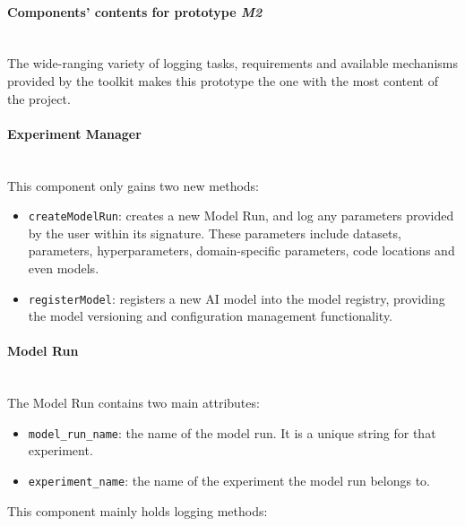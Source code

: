 \paragraph{Components' contents for prototype \emph{M2}} \mbox{} \\

The wide-ranging variety of logging tasks, requirements and available mechanisms provided by the toolkit makes this prototype the one with the most content of the
project.

\paragraph{Experiment Manager} \mbox{} \\

This component only gains two new methods:

\begin{itemize}
    \item \texttt{createModelRun}: creates a new Model Run, and log any parameters provided by the user within its signature. These parameters include
    datasets, parameters, hyperparameters, domain-specific parameters, code locations and even models.

    \item \texttt{registerModel}: registers a new \acrshort{AI} model into the model registry, providing the model versioning and configuration management functionality.
\end{itemize}

\paragraph{Model Run} \mbox{} \\

The Model Run contains two main attributes:

\begin{itemize}
    \item \texttt{model\_run\_name}: the name of the model run. It is a unique string for that experiment.
    \item \texttt{experiment\_name}: the name of the experiment the model run belongs to.
\end{itemize}

This component mainly holds logging methods:

